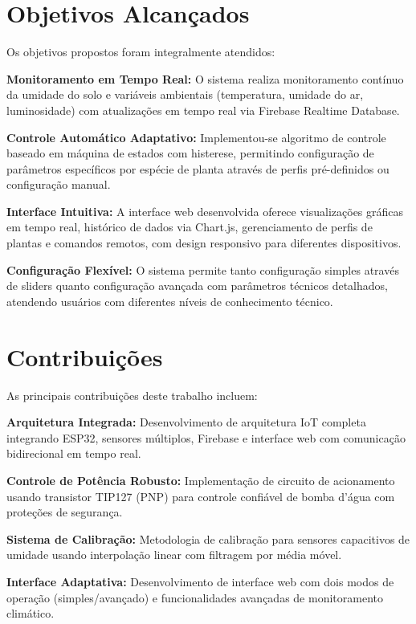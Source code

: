 \documentclass[twoside,english,brazilian]{UNISINOSmonografia}
\begin{document}
\section{Objetivos Alcançados}

Os objetivos propostos foram integralmente atendidos:

\textbf{Monitoramento em Tempo Real:} O sistema realiza monitoramento contínuo da umidade do solo e variáveis ambientais (temperatura, umidade do ar, luminosidade) com atualizações em tempo real via Firebase Realtime Database.

\textbf{Controle Automático Adaptativo:} Implementou-se algoritmo de controle baseado em máquina de estados com histerese, permitindo configuração de parâmetros específicos por espécie de planta através de perfis pré-definidos ou configuração manual.

\textbf{Interface Intuitiva:} A interface web desenvolvida oferece visualizações gráficas em tempo real, histórico de dados via Chart.js, gerenciamento de perfis de plantas e comandos remotos, com design responsivo para diferentes dispositivos.

\textbf{Configuração Flexível:} O sistema permite tanto configuração simples através de sliders quanto configuração avançada com parâmetros técnicos detalhados, atendendo usuários com diferentes níveis de conhecimento técnico.

\section{Contribuições}

As principais contribuições deste trabalho incluem:

\textbf{Arquitetura Integrada:} Desenvolvimento de arquitetura IoT completa integrando ESP32, sensores múltiplos, Firebase e interface web com comunicação bidirecional em tempo real.

\textbf{Controle de Potência Robusto:} Implementação de circuito de acionamento usando transistor TIP127 (PNP) para controle confiável de bomba d'água com proteções de segurança.

\textbf{Sistema de Calibração:} Metodologia de calibração para sensores capacitivos de umidade usando interpolação linear com filtragem por média móvel.

\textbf{Interface Adaptativa:} Desenvolvimento de interface web com dois modos de operação (simples/avançado) e funcionalidades avançadas de monitoramento climático.
\end{document}
